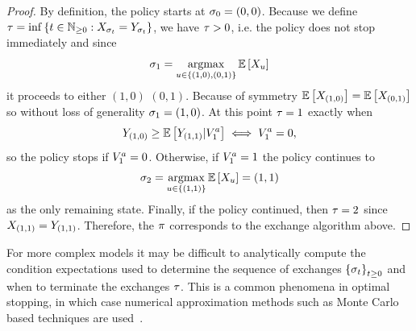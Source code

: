 \begin{proof}
    By definition, the policy starts at
    \(
        \sigma_{0}
        =
        (0,0)
    \).
    Because we define 
    \(
        \tau
        =
        \inf
        \left\{
            t\in\mathbb{N}_{\geq 0} :
            X_{
                \sigma_{t}
            }
            =
            Y_{
                \sigma_{t}
            }
        \right\}
    \),
    we have $\tau>0$, i.e. the policy does not stop immediately and since 
    \[
        \sigma_{1}
        =
        \operatorname*{argmax}_{
            u\in 
            \left\{
                (1,0),(0,1)
            \right\}
        }
        \mathbb{E}\left[
            X_{u}
        \right]
    \]
    it proceeds to either $(1,0)$ $(0,1)$. Because of symmetry 
    \(
        \mathbb{E}\left[
            X_{(1,0)}
        \right]
        =
        \mathbb{E}\left[
            X_{(0,1)}
        \right]
    \)
    so without loss of generality $\sigma_{1}=(1,0)$.
    At this point
    \(
        \tau
        =
        1
    \)
    exactly when
    \[
        Y_{(1,0)}
        \geq
        \mathbb{E}\left[
            Y_{(1,1)}
            | V^a_{1}
        \right]
        \iff
        V^a_{1}=0,
    \]
    so the policy stops if $V^a_{1}=0$.
    Otherwise, if $V^a_{1}=1$ the policy continues to
    \[
        \sigma_{2}
        =
        \operatorname*{argmax}_{
            u\in 
            \left\{
                (1,1)
            \right\}
        }
        \mathbb{E}\left[
            X_{u}
        \right]
        =
        (1,1)
    \]
    as the only remaining state.
    Finally, if the policy continued, 
    then $\tau=2$
    since $X_{(1,1)}=Y_{(1,1)}$.
    Therefore, the $\pi$ corresponds to the exchange algorithm above.
\end{proof}  

For more complex models it may be difficult to analytically compute the condition expectations
used to determine the sequence of exchanges
\(
    \left\{
        \sigma_{t}
    \right\}_{t\geq 0}
\)
and when to terminate the exchanges $\tau$. This is a common phenomena in optimal 
stopping, in which case numerical approximation methods such as Monte Carlo based techniques are 
used~\citep{longstaff2001valuing, tsitsiklis2001regression, broadie1997pricing}.




